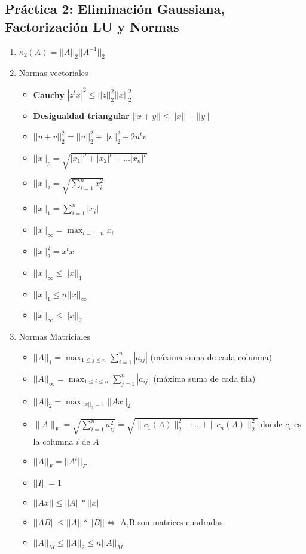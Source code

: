 \subsection*{Práctica 2: Eliminación Gaussiana, Factorización LU y Normas}
\begin{enumerate}
    \item $\kappa_2(A) = ||A||_2 ||A^{-1}||_2$
    
    \item Normas vectoriales
    \begin{itemize}
        \item \textbf{Cauchy} $|z^tx|^2 \leq ||z||_2^2 ||x||_2^2$
         \item \textbf{Desigualdad triangular} $||x+y|| \leq ||x||+||y||$
         \item $||u+v||_2^2 = ||u||_2^2+||v||_2^2 + 2u^tv$
         \item $||x||_p = \sqrt{|x_1|^p+|x_2|^p+\dots |x_n|^p}$
        \item $||x||_2 = \sqrt{\sum_{i=1}^{n} x_i^2}$
        \item $||x||_1 = \sum_{i=1}^{n} |x_i|$
        \item $||x||_{\infty}  = \max_{i=1 \dots n} x_i$
        \item $||x||_2^2 = x^tx$
        \item $||x||_{\infty} \leq ||x||_1$
        \item $||x||_1 \leq n ||x||_{\infty}$
        \item $||x||_{\infty} \leq ||x||_2$
    \end{itemize}
    
    \item Normas Matriciales
    \begin{itemize}
         \item $||A||_1 = \max_{1\leq j\leq n} \sum_{i=1}^{n} |a_{ij}|$ (máxima suma de cada columna)
          \item $||A||_{\infty} = \max_{1\leq i\leq n} \sum_{j=1}^{n} |a_{ij}|$ (máxima suma de cada fila)
         \item $||A||_2 = \max_{||x||_2=1} ||Ax||_2$
         \item $\| A \|_{F} = \sqrt{ \sum_{i=1}^{n} a_{ij}^2 } = \sqrt{ \| c_1(A) \|_2^2 + \ldots + \| c_n(A) \|_2^2}$ donde $c_i$ es la columna $i$ de $A$ 
         \item $||A||_F = ||A^t||_F$
        \item $||I|| = 1$
        \item $||Ax|| \leq ||A||*||x||$
        \item $||AB|| \leq ||A||*||B|| \iff$ A,B son matrices cuadradas
        \item $||A||_M \leq ||A||_2 \leq n ||A||_M$
    \end{itemize}
    

\end{enumerate}
